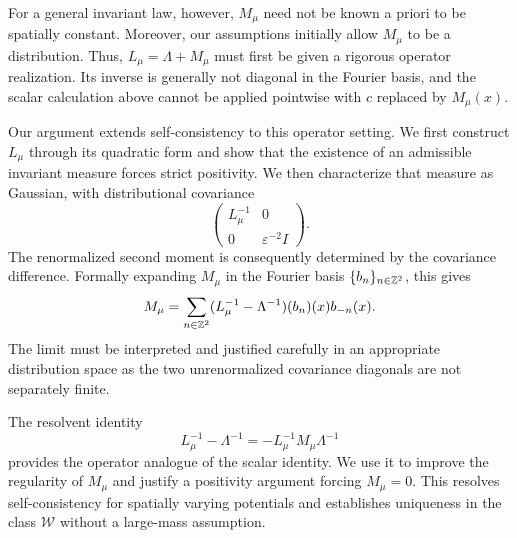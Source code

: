 For a general invariant law, however, $M_\mu$ need not be known a priori to be spatially constant.
Moreover, our assumptions initially allow $M_\mu$ to be a distribution. Thus, $L_\mu=\Lambda+M_\mu$ must first be given a rigorous operator realization.
Its inverse is generally not diagonal in the Fourier basis, and the scalar calculation above cannot be applied pointwise with $c$ replaced by $M_\mu(x)$.

Our argument extends self-consistency to this operator setting. We first construct $L_\mu$ through its quadratic form and show that the existence of an admissible invariant measure forces strict positivity. We then characterize that measure as Gaussian, with distributional covariance
\[
    \begin{pmatrix}
        L_\mu^{-1}&0\\
        0&\varepsilon^{-2}I
    \end{pmatrix}.
\]
The renormalized second moment is consequently determined by the covariance difference. Formally expanding $M_\mu$ in the Fourier basis $\{b_n\}_{n \in \mathbb{Z}^2}$, this gives
\[
    M_\mu
    =
    \sum_{n\in \mathbb{Z}^2} (L_\mu^{-1} - \Lambda^{-1}) (b_{n})(x) b_{-n}(x).
\]
The limit must be interpreted and justified carefully in an appropriate distribution space as the two unrenormalized covariance diagonals are not separately finite.

The resolvent identity
\[
    L_\mu^{-1}-\Lambda^{-1}
    =
    -L_\mu^{-1}M_\mu\Lambda^{-1}
\]
provides the operator analogue of the scalar identity. We use it to improve the regularity of $M_\mu$ and justify a positivity argument forcing $M_\mu=0$.
This resolves self-consistency for spatially varying potentials and establishes uniqueness in the class $\mathcal{W}$ without a large-mass assumption.

